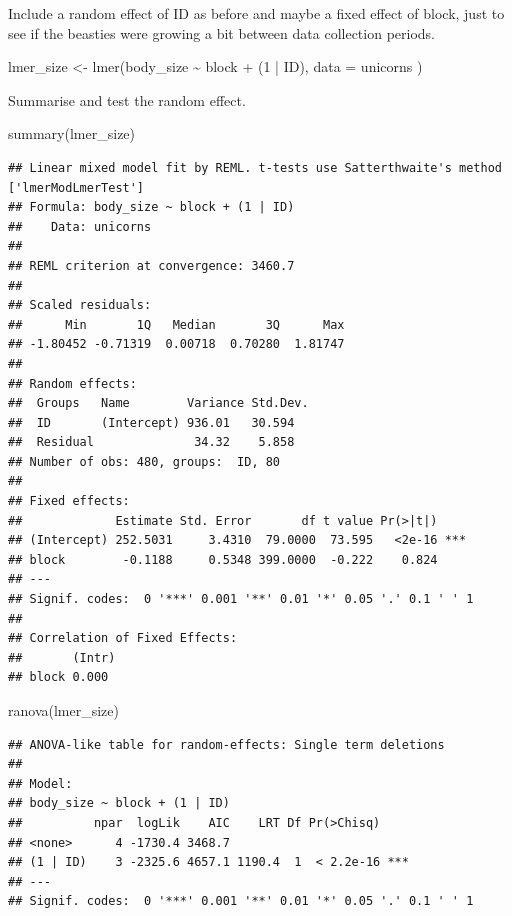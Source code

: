 \documentclass[
  12pt,
]{book}
\newenvironment{Shaded}{\begin{snugshade}}{\end{snugshade}}
\newcommand{\AttributeTok}[1]{\textcolor[rgb]{0.77,0.63,0.00}{#1}}
\newcommand{\DecValTok}[1]{\textcolor[rgb]{0.00,0.00,0.81}{#1}}
\newcommand{\FunctionTok}[1]{\textcolor[rgb]{0.00,0.00,0.00}{#1}}
\newcommand{\NormalTok}[1]{#1}
\newcommand{\OtherTok}[1]{\textcolor[rgb]{0.56,0.35,0.01}{#1}}
\newcommand{\SpecialCharTok}[1]{\textcolor[rgb]{0.00,0.00,0.00}{#1}}
\begin{document}
Include a random effect of ID as before and maybe a fixed effect of block, just to see if the beasties were growing a bit between data collection periods.

\begin{Shaded}
\begin{Highlighting}[]
\NormalTok{lmer\_size }\OtherTok{\textless{}{-}} \FunctionTok{lmer}\NormalTok{(body\_size }\SpecialCharTok{\textasciitilde{}}\NormalTok{ block }\SpecialCharTok{+}\NormalTok{ (}\DecValTok{1} \SpecialCharTok{|}\NormalTok{ ID),}
  \AttributeTok{data =}\NormalTok{ unicorns}
\NormalTok{)}
\end{Highlighting}
\end{Shaded}

Summarise and test the random effect.

\begin{Shaded}
\begin{Highlighting}[]
\FunctionTok{summary}\NormalTok{(lmer\_size)}
\end{Highlighting}
\end{Shaded}

\begin{verbatim}
## Linear mixed model fit by REML. t-tests use Satterthwaite's method ['lmerModLmerTest']
## Formula: body_size ~ block + (1 | ID)
##    Data: unicorns
## 
## REML criterion at convergence: 3460.7
## 
## Scaled residuals: 
##      Min       1Q   Median       3Q      Max 
## -1.80452 -0.71319  0.00718  0.70280  1.81747 
## 
## Random effects:
##  Groups   Name        Variance Std.Dev.
##  ID       (Intercept) 936.01   30.594  
##  Residual              34.32    5.858  
## Number of obs: 480, groups:  ID, 80
## 
## Fixed effects:
##             Estimate Std. Error       df t value Pr(>|t|)    
## (Intercept) 252.5031     3.4310  79.0000  73.595   <2e-16 ***
## block        -0.1188     0.5348 399.0000  -0.222    0.824    
## ---
## Signif. codes:  0 '***' 0.001 '**' 0.01 '*' 0.05 '.' 0.1 ' ' 1
## 
## Correlation of Fixed Effects:
##       (Intr)
## block 0.000
\end{verbatim}

\begin{Shaded}
\begin{Highlighting}[]
\FunctionTok{ranova}\NormalTok{(lmer\_size)}
\end{Highlighting}
\end{Shaded}

\begin{verbatim}
## ANOVA-like table for random-effects: Single term deletions
## 
## Model:
## body_size ~ block + (1 | ID)
##          npar  logLik    AIC    LRT Df Pr(>Chisq)    
## <none>      4 -1730.4 3468.7                         
## (1 | ID)    3 -2325.6 4657.1 1190.4  1  < 2.2e-16 ***
## ---
## Signif. codes:  0 '***' 0.001 '**' 0.01 '*' 0.05 '.' 0.1 ' ' 1
\end{verbatim}
\end{document}
